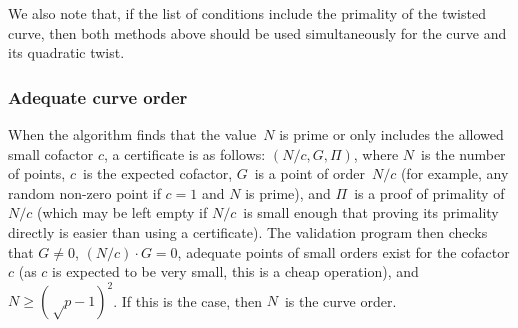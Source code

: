 \documentclass[twocolumn,letterpaper,10pt]{article}
\begin{document}
\smallskip

We also note that, if the list of conditions
include the primality of the twisted curve,
then both methods above should be used
simultaneously for the curve and its quadratic twist.
% 
% 
% 

\subsubsection{Adequate curve order}

When the algorithm finds that the value~$N$ is prime
or only includes the allowed small cofactor $c$,
a certificate is as follows: $(N/c, G, Π)$,
where $N$~is the number of points, $c$~is the expected cofactor,
$G$~is a point of order~$N/c$
(for example, any random non-zero point if $c = 1$ and $N$ is prime),
and $Π$~is a proof of primality of~$N/c$
(which may be left empty if $N/c$~is small enough
that proving its primality directly is easier than using a certificate).
The validation program then checks that $G ≠ 0$,
$(N/c) · G = 0$, adequate points of small orders exist for the cofactor $c$
(as $c$ is expected to be very small, this is a cheap operation),
and~$N ≥ (√p-1)^2$.
If this is the case, then $N$~is the curve order.
\end{document}
